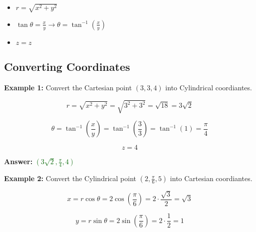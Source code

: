 \documentclass[10pt]{article}                               %
\begin{document}
\begin{adjustwidth}{2em}{0pt}
\begin{adjustwidth}{2em}{0pt}
        \begin{itemize}
            \item \( r = \sqrt{x^2 + y^2} \)
            \item \( \tan\theta = \frac{x}{y}  \rightarrow  \theta = \tan^{-1}\left(\frac{x}{y}\right) \)
            \item \( z = z \)
        \end{itemize}

        \break

        \begin{examplebox}

            \subsection*{Converting Coordinates}
        
            \textbf{Example 1:} Convert the Cartesian point \( \left(3,3,4\right) \) into Cylindrical coordiantes.
            \vspace{0.5em}

            \begin{adjustwidth}{2em}{0pt}

                \[ r = \sqrt{x^2 + y^2} = \sqrt{3^2 + 3^2} = \sqrt{18} = 3\sqrt{2} \]

                \[ \theta = \tan^{-1}\left(\frac{x}{y}\right) = \tan^{-1}\left(\frac{3}{3}\right) = \tan^{-1}(1) = \frac{\pi}{4} \]

                \[ z = 4 \]

                \textbf{Answer:} \textcolor{darkgreen}{\( \left(3\sqrt{2}, \frac{\pi}{4}, 4\right) \)}

            \end{adjustwidth}

            \vspace{1em}

            \textbf{Example 2:} Convert the Cylindrical point \( \left(2, \frac{\pi}{6}, 5\right) \) into Cartesian coordiantes.
            \vspace{0.5em}

            \begin{adjustwidth}{2em}{0pt}

                \[ x = r\cos\theta = 2\cos\left(\frac{\pi}{6}\right) = 2 \cdot \frac{\sqrt{3}}{2} = \sqrt{3} \]

                \[ y = r\sin\theta = 2\sin\left(\frac{\pi}{6}\right) = 2 \cdot \frac{1}{2} = 1 \]


\end{adjustwidth}
\end{examplebox}
\end{adjustwidth}
\end{adjustwidth}
\end{document}
